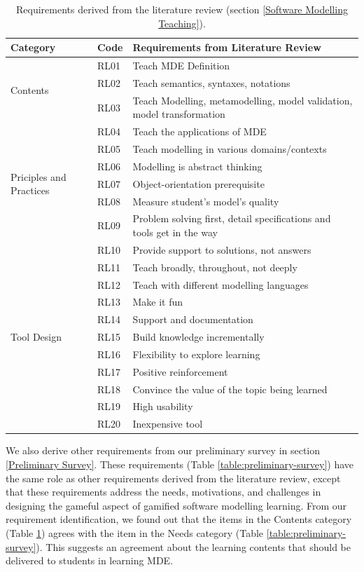 \documentclass[12pt, a4paper]{report}
\begin{document}
\begin{table}[ht]\caption{Requirements derived from the literature review (section \ref{Software Modelling Teaching}).}
\label{table:requirements}
\begin{center}
\begin{tabular}{ p{2cm}p{1cm}p{10cm} } 
\hline
Category & Code & Requirements from Literature Review \\
\hline
\multirow{3}{2cm}{Contents} 
& RL01 & Teach MDE Definition \\ 
& RL02 & Teach semantics, syntaxes, notations \\ 
& RL03 & Teach Modelling, metamodelling, model validation, model transformation\\
& RL04 & Teach the applications of MDE \\
& RL05 & Teach modelling in various domains/contexts \\

\hline
\multirow{3}{2cm}{Priciples and Practices} 
& RL06 & Modelling is abstract thinking \\ 
& RL07 & Object-orientation prerequisite \\
& RL08 & Measure student's model's quality \\
& RL09 & Problem solving first, detail specifications and tools get in the way \\
& RL10 & Provide support to solutions, not answers \\ 
& RL11 & Teach broadly, throughout, not deeply \\
& RL12 & Teach with different modelling languages \\  
& RL13 & Make it fun \\ 
\hline
\multirow{3}{2cm}{Tool Design}
& RL14 & Support and documentation \\
& RL15 & Build knowledge incrementally \\
& RL16 & Flexibility to explore learning \\
& RL17 & Positive reinforcement \\
& RL18 & Convince the value of the topic being learned \\ 
& RL19 & High usability \\ 
& RL20 & Inexpensive tool \\ 
\hline
\end{tabular}
\end{center}
\end{table}


We also derive other requirements from our preliminary survey in section \ref{Preliminary Survey}. These requirements (Table \ref{table:preliminary-survey}) have the same role as other requirements derived from the literature review, except that these requirements   address the needs, motivations, and challenges in designing the gameful aspect of gamified software modelling learning. From our requirement identification, we found out that the items in the Contents category (Table \ref{table:requirements}) agrees with the item in the Needs category (Table \ref{table:preliminary-survey}). This suggests an agreement about the learning contents that should be delivered to students in learning MDE.
\end{document}
